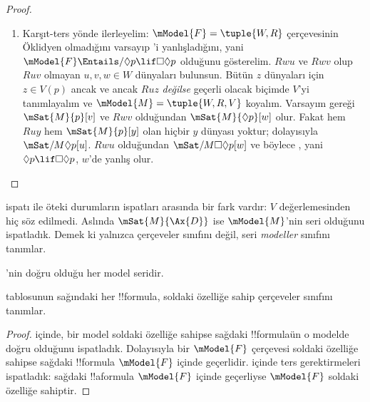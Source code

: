 \begin{proof}
\begin{enumerate}
    tanımlayalım (diğer yerlerde $V$ gelişigüzel olsun) ve
    $\mModel{M}=\tuple{W,R,V}$ koyalım. $V$'nin tanımı gereği $Ruz$ olan
    her $z$ için $\mSat{M}{p}[z]$, dolayısıyla $\mSat{M}{\Box p}[u]$ olur.
    Varsayıma göre , yani $\Box p\lif\Box\Box p$, $u$'da doğrudur;
    öyleyse $\mSat{M}{\Box\Box p}[u]$. $Ruv$ ve $Rvw$ olduğundan
    $\mSat{M}{p}[w]$; $V$'nin tanımına göre bu ancak $Ruw$ ise mümkündür.
  \item Karşıt-ters yönde ilerleyelim: $\mModel{F}=\tuple{W,R}$
    çerçevesinin Öklidyen olmadığını varsayıp 'i yanlışladığını, yani
    $\mModel{F}\Entails/\Diamond p\lif\Box\Diamond p$ olduğunu gösterelim.
    $Rwu$ ve $Rwv$ olup $Ruv$ olmayan $u,v,w\in W$ dünyaları bulunsun.
    Bütün $z$ dünyaları için $z\in V(p)$ ancak ve ancak $Ruz$ \emph{değilse}
    geçerli olacak biçimde $V$'yi tanımlayalım ve
    $\mModel{M}=\tuple{W,R,V}$ koyalım. Varsayım gereği
    $\mSat{M}{p}[v]$ ve $Rwv$ olduğundan $\mSat{M}{\Diamond p}[w]$ olur.
    Fakat hem $Ruy$ hem $\mSat{M}{p}[y]$ olan hiçbir $y$ dünyası yoktur;
    dolayısıyla $\mSat/{M}{\Diamond p}[u]$. $Rwu$ olduğundan
    $\mSat/{M}{\Box\Diamond p}[w]$ ve böylece , yani
    $\Diamond p\lif\Box\Diamond p$, $w$'de yanlış olur.
  \end{enumerate}
\end{proof}

 ispatı ile öteki durumların ispatları arasında bir fark vardır:
$V$ değerlemesinden hiç söz edilmedi. Aslında $\mSat{M}{\Ax{D}}$ ise
$\mModel{M}$'nin seri olduğunu ispatladık. Demek ki  yalnızca
çerçeveler sınıfını değil, seri \emph{modeller} sınıfını tanımlar.

\begin{cor}
  'nin doğru olduğu her model seridir.
\end{cor}

\begin{cor}
 tablosunun sağındaki her !!{formula}, soldaki
özelliğe sahip çerçeveler sınıfını tanımlar.
\end{cor}

\begin{proof}
   içinde, bir model soldaki özelliğe sahipse
  sağdaki !!{formula}{}ün o modelde doğru olduğunu ispatladık. Dolayısıyla
  bir $\mModel{F}$ çerçevesi soldaki özelliğe sahipse sağdaki !!{formula}
  $\mModel{F}$ içinde geçerlidir.  içinde
  ters gerektirmeleri ispatladık: sağdaki !!a{formula} $\mModel{F}$ içinde
  geçerliyse $\mModel{F}$ soldaki özelliğe sahiptir.
\end{proof}

